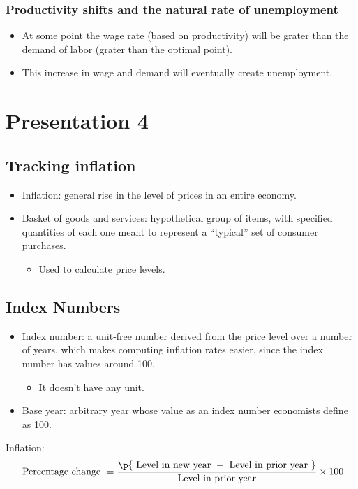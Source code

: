 \documentclass[openany]{book}
\begin{document}
\subsection{Productivity shifts and the natural rate of unemployment}
\begin{itemize}
    \item At some point the wage rate (based on productivity) will be grater than the demand of labor (grater than the optimal point).
    \item This increase in wage and demand will eventually create unemployment. 
\end{itemize}

\chapter{Presentation 4}
\section{Tracking inflation}
\begin{itemize}
    \item Inflation: general rise in the level of prices in an entire economy.  
    \item Basket of goods and services: hypothetical group of items, with specified quantities of each one meant to represent a ``typical'' set of consumer purchases.
        \begin{itemize}
            \item Used to calculate price levels. 
        \end{itemize}
\end{itemize}

\section{Index Numbers}
\begin{itemize}
    \item Index number: a unit-free number derived from the price level over a number of years, which makes computing inflation rates easier, since the index number has values around 100.
        \begin{itemize}
            \item It doesn't have any unit.
        \end{itemize}
    \item Base year: arbitrary year whose value as an index number economists define as 100.
\end{itemize}
Inflation: 
\[
  \text{ Percentage change } = \frac{\p{\text{ Level in new year } - \text{ Level in prior year }} }{\text{ Level in prior year }} \times 100
\]
\end{document}
